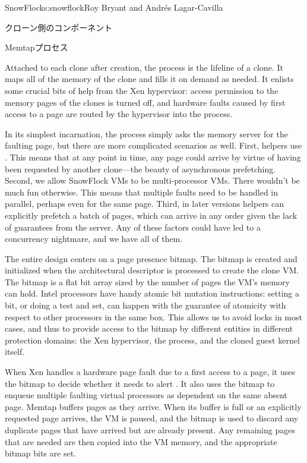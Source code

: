 \begin{aosachapter}{SnowFlock}{s:snowflock}{Roy Bryant and Andr\'e{s} Lagar-Cavilla}
\begin{aosasect1}{クローン側のコンポーネント}
\begin{aosasect2}{Memtapプロセス}

Attached to each clone after creation, the  process is the
lifeline of a clone. It maps all of the memory of the clone and fills
it on demand as needed.  It enlists some crucial bits of help from the
Xen hypervisor: access permission to the memory pages of the clones is
turned off, and hardware faults caused by first access to a page are
routed by the hypervisor into the  process.

In its simplest incarnation, the  process simply asks the
memory server for the faulting page, but there are more complicated
scenarios as well.  First,  helpers use . This means that at any
point in time, any page could arrive by virtue of having been
requested by another clone---the beauty of asynchronous
prefetching. Second, we allow SnowFlock VMs to be multi-processor VMs.
There wouldn't be much fun otherwise. This means that multiple faults
need to be handled in parallel, perhaps even for the same page.
Third, in later versions  helpers can explicitly prefetch a
batch of pages, which can arrive in any order given the lack of
guarantees from the  server.  Any of these factors could have led
to a concurrency nightmare, and we have all of them.

The entire  design centers on a page presence bitmap. The bitmap
is created and initialized when the architectural descriptor is
processed to create the clone VM\@.
The bitmap is a flat bit array sized by the number of pages the VM's memory can hold. 
Intel processors have handy atomic
bit mutation instructions: setting a bit, or doing a test and set, can
happen with the guarantee of atomicity with respect to other
processors in the same box.  This allows us to avoid
locks in most cases, and thus to provide access to the bitmap by
different entities in different protection domains: the Xen
hypervisor, the  process, and the cloned guest kernel itself.

When Xen handles a hardware page fault due to a first access to a
page, it uses the bitmap to decide whether it needs to alert
. It also uses the bitmap to enqueue multiple faulting virtual
processors as dependent on the same absent page. Memtap buffers pages
as they arrive.  When its buffer is full or an explicitly requested
page arrives, the VM is paused, and the bitmap is used to discard any
duplicate pages that have arrived but are already present. Any
remaining pages that are needed are then copied into the VM memory,
and the appropriate bitmap bits are set.


\end{aosasect2}
\end{aosasect1}
\end{aosachapter}

